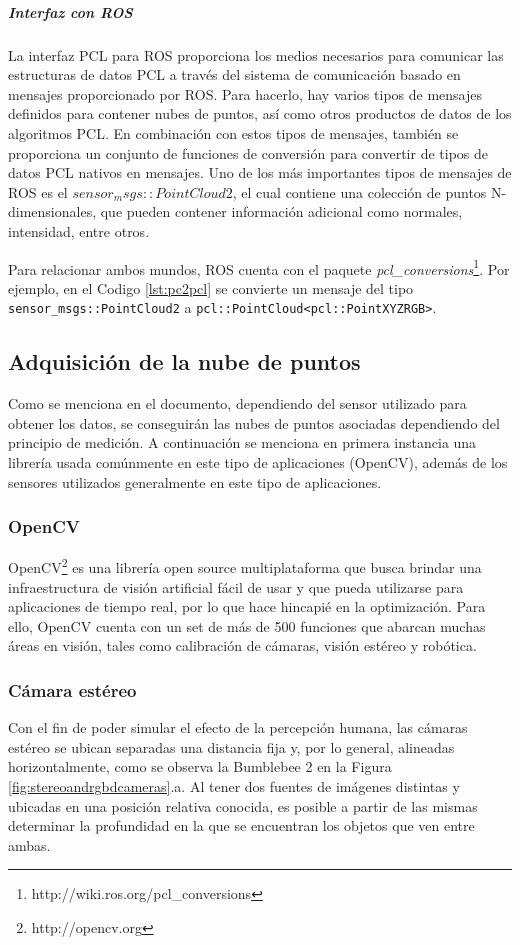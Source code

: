 \ifimagenes
    \ifimagenespaper
    \else
    \subparagraph{Interfaz con ROS}
    \fi
\fi
La interfaz PCL para ROS proporciona los medios necesarios para comunicar las estructuras de datos PCL a través del sistema de comunicación basado en mensajes proporcionado por ROS. Para hacerlo, hay varios tipos de mensajes definidos para contener nubes de puntos, así como otros productos de datos de los algoritmos PCL. En combinación con estos tipos de mensajes, también se proporciona un conjunto de funciones de conversión para convertir de tipos de datos PCL nativos en mensajes. Uno de los más importantes tipos de mensajes de ROS es el $sensor_msgs::PointCloud2$, el cual contiene una colección de puntos N-dimensionales, que pueden contener información adicional como normales, intensidad, entre otros.

Para relacionar ambos mundos, ROS cuenta con el paquete \textit{pcl\_conversions}\footnote{http://wiki.ros.org/pcl\_conversions}. Por ejemplo, en el Codigo \ref{lst:pc2pcl} se convierte un mensaje del tipo \lstinline{sensor_msgs::PointCloud2} a \lstinline{pcl::PointCloud<pcl::PointXYZRGB>}.




\subsection{Adquisición de la nube de puntos}
Como se menciona en el documento, dependiendo del sensor utilizado para obtener los datos, se conseguirán las nubes de puntos asociadas dependiendo del principio de 
\ifimagenes
medición. A continuación se menciona en primera instancia una librería usada comúnmente en este tipo de aplicaciones (OpenCV), además de los sensores utilizados generalmente en este tipo de aplicaciones.

\subsubsection{OpenCV}
OpenCV\footnote{http://opencv.org} es una librería open source multiplataforma que busca brindar una infraestructura de visión artificial fácil de usar y que pueda utilizarse para aplicaciones de tiempo real, por lo que hace hincapié en la optimización. Para ello, OpenCV cuenta con un set de más de 500 funciones \cite{kaehler2017} que abarcan muchas áreas en visión, tales como calibración de cámaras, visión estéreo y robótica.

\subsubsection{Cámara estéreo}
Con el fin de poder simular el efecto de la percepción humana, las cámaras estéreo se ubican separadas una distancia fija y, por lo general, alineadas horizontalmente, como se observa la Bumblebee 2 en la Figura \ref{fig:stereoandrgbdcameras}.a. Al tener dos fuentes de imágenes distintas y ubicadas en una posición relativa conocida, es posible a partir de las mismas determinar la profundidad en la que se encuentran los objetos que ven entre ambas. 

